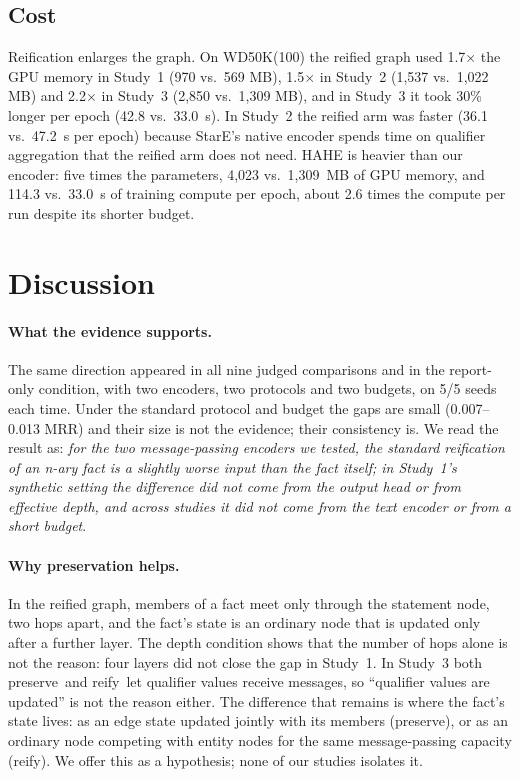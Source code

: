 \documentclass[11pt,a4paper]{article}
\newcommand{\hyper}{\textsf{preserve}}
\newcommand{\reif}{\textsf{reify}}
\begin{document}
\subsection{Cost}

Reification enlarges the graph. On WD50K(100) the reified graph used 1.7$\times$ the GPU memory in Study~1 (970 vs.\ 569 MB), 1.5$\times$ in Study~2 (1,537 vs.\ 1,022 MB) and 2.2$\times$ in Study~3 (2,850 vs.\ 1,309 MB), and in Study~3 it took 30\% longer per epoch (42.8 vs.\ 33.0~s). In Study~2 the reified arm was faster (36.1 vs.\ 47.2~s per epoch) because StarE's native encoder spends time on qualifier aggregation that the reified arm does not need. HAHE is heavier than our encoder: five times the parameters, 4,023 vs.\ 1,309~MB of GPU memory, and 114.3 vs.\ 33.0~s of training compute per epoch, about 2.6 times the compute per run despite its shorter budget.

\FloatBarrier
\section{Discussion}

\paragraph{What the evidence supports.}
The same direction appeared in all nine judged comparisons and in the report-only condition, with two encoders, two protocols and two budgets, on 5/5 seeds each time. Under the standard protocol and budget the gaps are small (0.007--0.013 MRR) and their size is not the evidence; their consistency is. We read the result as: \emph{for the two message-passing encoders we tested, the standard reification of an n-ary fact is a slightly worse input than the fact itself; in Study~1's synthetic setting the difference did not come from the output head or from effective depth, and across studies it did not come from the text encoder or from a short budget}.

\paragraph{Why preservation helps.}
In the reified graph, members of a fact meet only through the statement node, two hops apart, and the fact's state is an ordinary node that is updated only after a further layer. The depth condition shows that the number of hops alone is not the reason: four layers did not close the gap in Study~1. In Study~3 both \hyper\ and \reif\ let qualifier values receive messages, so ``qualifier values are updated'' is not the reason either. The difference that remains is where the fact's state lives: as an edge state updated jointly with its members (\hyper), or as an ordinary node competing with entity nodes for the same message-passing capacity (\reif). We offer this as a hypothesis; none of our studies isolates it.
\end{document}

